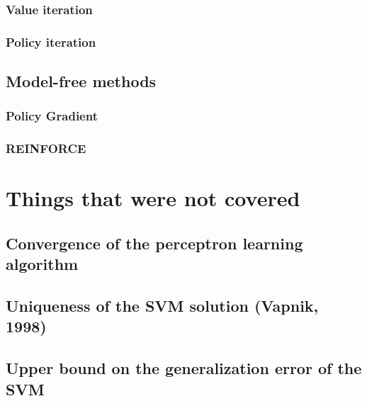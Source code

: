 \documentclass[11pt]{book} %
\begin{document}
\subsection{Value iteration}
\subsection{Policy iteration}

\section{Model-free methods}
\subsection{Policy Gradient}
\subsection{REINFORCE}

%
%
%
%
%
%
%
%
%
%
%
%
%
%
%
%

\chapter{Things that were not covered}

\section{Convergence of the perceptron learning algorithm}

\section{Uniqueness of the SVM solution (Vapnik, 1998)}

\section{Upper bound on the generalization error of the SVM}

\backmatter
\end{document}
